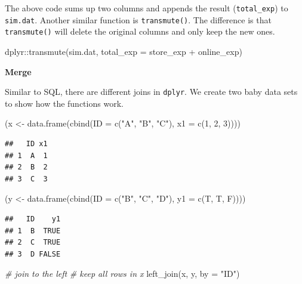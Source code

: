 \documentclass[
  12pt,
]{krantz}
\makeatletter
\newenvironment{Shaded}{\begin{snugshade}}{\end{snugshade}}
\newcommand{\AttributeTok}[1]{\textcolor[rgb]{0.61,0.61,0.61}{#1}}
\newcommand{\CommentTok}[1]{\textcolor[rgb]{0.37,0.37,0.37}{\textit{#1}}}
\newcommand{\DecValTok}[1]{\textcolor[rgb]{0.06,0.06,0.06}{#1}}
\newcommand{\FunctionTok}[1]{\textcolor[rgb]{0,0,0}{#1}}
\newcommand{\NormalTok}[1]{#1}
\newcommand{\OtherTok}[1]{\textcolor[rgb]{0.37,0.37,0.37}{#1}}
\newcommand{\SpecialCharTok}[1]{\textcolor[rgb]{0,0,0}{#1}}
\newcommand{\StringTok}[1]{\textcolor[rgb]{0.5,0.5,0.5}{#1}}
\newenvironment{kframe}{%
\medskip{}
\setlength{\fboxsep}{.8em}
 \def\at@end@of@kframe{}%
 \ifinner\ifhmode%
  \def\at@end@of@kframe{\end{minipage}}%
  \begin{minipage}{\columnwidth}%
 \fi\fi%
 \def\FrameCommand##1{\hskip\@totalleftmargin \hskip-\fboxsep
 \colorbox{shadecolor}{##1}\hskip-\fboxsep
     \hskip-\linewidth \hskip-\@totalleftmargin \hskip\columnwidth}%
 \MakeFramed {\advance\hsize-\width
   \@totalleftmargin\z@ \linewidth\hsize
   \@setminipage}}%
 {\par\unskip\endMakeFramed%
 \at@end@of@kframe}
\renewenvironment{Shaded}{\begin{kframe}}{\end{kframe}}
\makeatother
\begin{document}
The above code sums up two columns and appends the result (\texttt{total\_exp}) to \texttt{sim.dat}. Another similar function is \texttt{transmute()}. The difference is that \texttt{transmute()} will delete the original columns and only keep the new ones.

\begin{Shaded}
\begin{Highlighting}[]
\NormalTok{dplyr}\SpecialCharTok{::}\FunctionTok{transmute}\NormalTok{(sim.dat, }\AttributeTok{total\_exp =}\NormalTok{ store\_exp }\SpecialCharTok{+}\NormalTok{ online\_exp)}
\end{Highlighting}
\end{Shaded}

\textbf{Merge}

Similar to SQL, there are different joins in \texttt{dplyr}. We create two baby data sets to show how the functions work.

\begin{Shaded}
\begin{Highlighting}[]
\NormalTok{(x }\OtherTok{\textless{}{-}} \FunctionTok{data.frame}\NormalTok{(}\FunctionTok{cbind}\NormalTok{(}\AttributeTok{ID =} \FunctionTok{c}\NormalTok{(}\StringTok{"A"}\NormalTok{, }\StringTok{"B"}\NormalTok{, }\StringTok{"C"}\NormalTok{), }\AttributeTok{x1 =} \FunctionTok{c}\NormalTok{(}\DecValTok{1}\NormalTok{, }\DecValTok{2}\NormalTok{, }\DecValTok{3}\NormalTok{))))}
\end{Highlighting}
\end{Shaded}

\begin{verbatim}
##   ID x1
## 1  A  1
## 2  B  2
## 3  C  3
\end{verbatim}

\begin{Shaded}
\begin{Highlighting}[]
\NormalTok{(y }\OtherTok{\textless{}{-}} \FunctionTok{data.frame}\NormalTok{(}\FunctionTok{cbind}\NormalTok{(}\AttributeTok{ID =} \FunctionTok{c}\NormalTok{(}\StringTok{"B"}\NormalTok{, }\StringTok{"C"}\NormalTok{, }\StringTok{"D"}\NormalTok{), }\AttributeTok{y1 =} \FunctionTok{c}\NormalTok{(T, T, F))))}
\end{Highlighting}
\end{Shaded}

\begin{verbatim}
##   ID    y1
## 1  B  TRUE
## 2  C  TRUE
## 3  D FALSE
\end{verbatim}

\begin{Shaded}
\begin{Highlighting}[]
\CommentTok{\# join to the left}
\CommentTok{\# keep all rows in x}
\FunctionTok{left\_join}\NormalTok{(x, y, }\AttributeTok{by =} \StringTok{"ID"}\NormalTok{)}
\end{Highlighting}
\end{Shaded}
\end{document}

